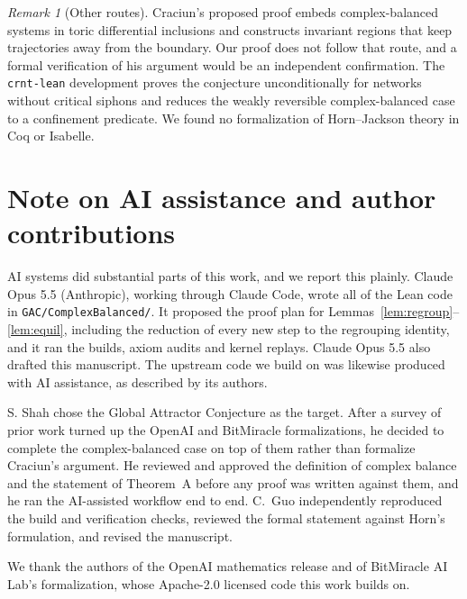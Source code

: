 \documentclass[11pt]{article}
\newcommand{\lean}[1]{\texttt{#1}}
\theoremstyle{plain}
\theoremstyle{definition}
\theoremstyle{remark}
\newtheorem{remark}[theorem]{Remark}
\begin{document}
\begin{remark}[Other routes]
Craciun's proposed proof \cite{Craciun15} embeds complex-balanced systems in toric differential inclusions and constructs invariant regions that keep trajectories away from the boundary. Our proof does not follow that route, and a formal verification of his argument would be an independent confirmation. The \lean{crnt-lean} development \cite{CRNTLean} proves the conjecture unconditionally for networks without critical siphons and reduces the weakly reversible complex-balanced case to a confinement predicate. We found no formalization of Horn--Jackson theory in Coq or Isabelle.
\end{remark}

\section*{Note on AI assistance and author contributions}

AI systems did substantial parts of this work, and we report this plainly. Claude Opus 5.5 (Anthropic), working through Claude Code, wrote all of the Lean code in \lean{GAC/ComplexBalanced/}. It proposed the proof plan for Lemmas~\ref{lem:regroup}--\ref{lem:equil}, including the reduction of every new step to the regrouping identity, and it ran the builds, axiom audits and kernel replays. Claude Opus 5.5 also drafted this manuscript. The upstream code we build on was likewise produced with AI assistance, as described by its authors.

S. Shah chose the Global Attractor Conjecture as the target. After a survey of prior work turned up the OpenAI and BitMiracle formalizations, he decided to complete the complex-balanced case on top of them rather than formalize Craciun's argument. He reviewed and approved the definition of complex balance and the statement of Theorem~A before any proof was written against them, and he ran the AI-assisted workflow end to end. C.~Guo independently reproduced the build and verification checks, reviewed the formal statement against Horn's formulation, and revised the manuscript.

We thank the authors of the OpenAI mathematics release and of BitMiracle AI Lab's formalization, whose Apache-2.0 licensed code this work builds on.
\end{document}
